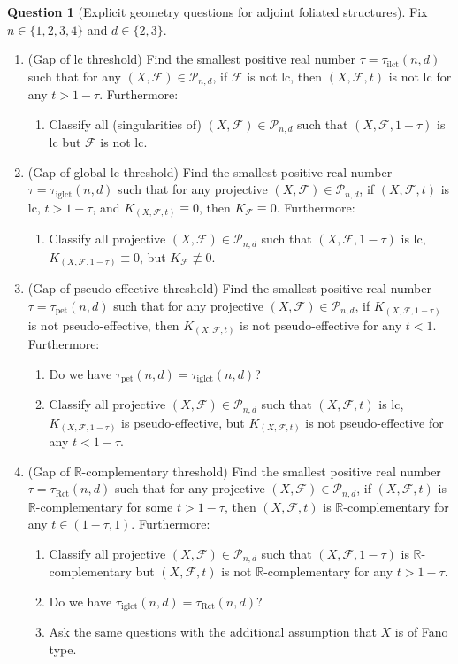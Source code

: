 \documentclass[11pt,reqno]{amsart}
\numberwithin{equation}{section}
\newcommand{\ilct}{\operatorname{ilct}}
\newcommand{\iglct}{\operatorname{iglct}}
\newcommand{\pet}{\operatorname{pet}}
\newcommand{\Rct}{\operatorname{Rct}}
\newcommand{\Ff}{\mathcal{F}}
\theoremstyle{definition}
\newtheorem{ques}[thm]{Question}
\begin{document}
\begin{ques}[Explicit geometry questions for adjoint foliated structures]
Fix $n\in\{1,2,3,4\}$ and $d\in\{2,3\}$. 
\begin{enumerate}
    \item (Gap of lc threshold) Find the smallest positive real number $\tau=\tau_{\ilct}(n,d)$ such that for any $(X,\Ff)\in\mathcal{P}_{n,d}$, if $\Ff$ is not lc, then $(X,\Ff,t)$ is not lc for any $t>1-\tau$. Furthermore:
    \begin{enumerate}
        \item Classify all (singularities of) $(X,\Ff)\in\mathcal{P}_{n,d}$ such that $(X,\Ff,1-\tau)$ is lc but $\Ff$ is not lc.
    \end{enumerate}

    \item (Gap of global lc threshold) Find the smallest positive real number $\tau=\tau_{\iglct}(n,d)$ such that for any projective $(X,\Ff)\in\mathcal{P}_{n,d}$, if $(X,\Ff,t)$ is lc, $t>1-\tau$, and $K_{(X,\Ff,t)}\equiv 0$, then $K_{\Ff}\equiv 0$. Furthermore:
    \begin{enumerate}
      \item Classify all projective $(X,\Ff)\in\mathcal{P}_{n,d}$ such that $(X,\Ff,1-\tau)$ is lc, $K_{(X,\Ff,1-\tau)}\equiv 0$, but $K_{\Ff}\not\equiv 0$.  
    \end{enumerate}

    \item (Gap of pseudo-effective threshold) Find the smallest positive real number $\tau=\tau_{\pet}(n,d)$ such that for any projective $(X,\Ff)\in\mathcal{P}_{n,d}$, if $K_{(X,\Ff,1-\tau)}$ is not pseudo-effective, then $K_{(X,\Ff,t)}$ is not pseudo-effective for any $t<1$. Furthermore:
    \begin{enumerate}
      \item Do we have $\tau_{\pet}(n,d)=\tau_{\iglct}(n,d)$?
      \item Classify all projective $(X,\Ff)\in\mathcal{P}_{n,d}$ such that $(X,\Ff,t)$ is lc, $K_{(X,\Ff,1-\tau)}$ is pseudo-effective, but $K_{(X,\Ff,t)}$ is not pseudo-effective for any $t<1-\tau$.
    \end{enumerate}

    \item (Gap of $\mathbb R$-complementary threshold) Find the smallest positive real number $\tau=\tau_{\Rct}(n,d)$ such that for any projective $(X,\Ff)\in\mathcal{P}_{n,d}$, if $(X,\Ff,t)$ is $\mathbb R$-complementary for some $t>1-\tau$, then $(X,\Ff,t)$ is $\mathbb R$-complementary for any $t\in (1-\tau,1)$. Furthermore:
    \begin{enumerate}
        \item Classify all projective $(X,\Ff)\in\mathcal{P}_{n,d}$ such that $(X,\Ff,1-\tau)$ is $\mathbb R$-complementary but $(X,\Ff,t)$ is not $\mathbb R$-complementary for any $t>1-\tau$. 
        \item Do we have $\tau_{\iglct}(n,d)=\tau_{\Rct}(n,d)$?
        \item Ask the same questions with the additional assumption that $X$ is of Fano type.
    \end{enumerate}


\end{enumerate}
\end{ques}
\end{document}

